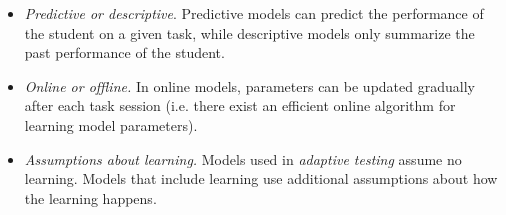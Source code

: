 \begin{itemize}
\item \emph{Predictive or descriptive}.
Predictive models can predict the performance of the student on a given task,
while descriptive models only summarize the past performance of the student.
\item \emph{Online or offline.}
In online models, parameters can be updated gradually after each task session
(i.e. there exist an efficient online algorithm for learning model parameters).
\item \emph{Assumptions about learning.}
Models used in \emph{adaptive testing} \cite{cat} assume no learning.
Models that include learning use additional assumptions
about how the learning happens. %
\end{itemize}


